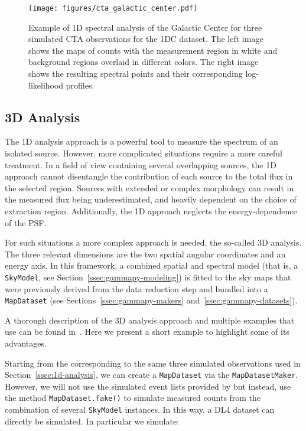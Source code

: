 \documentclass[traditabstract, longauth]{aa}
\newcommand{\code}[1]{\texttt{#1}}
\begin{document}
\begin{figure*}[t]
	\centering
	\texttt{[image: figures/cta\_galactic\_center.pdf]}
	\caption{
		Example of 1D spectral analysis of the Galactic Center for three simulated CTA
		observations for the 1DC dataset. The left image shows the maps of counts with the measurement
		region in white and background regions overlaid in different colors. The right image
		shows the resulting spectral points and their corresponding log-likelihood
		profiles.} \label{fig:cta_galactic_center} \end{figure*}


\subsection{3D Analysis}
\label{ssec:3d-analysis}
The 1D analysis approach is a powerful tool to measure the spectrum of an
isolated source. However, more complicated situations require a more careful
treatment. In a field of view containing several overlapping sources, the 1D
approach cannot disentangle the contribution of each source to the total flux in
the selected region. Sources with extended or complex morphology can result in
the measured flux being underestimated, and heavily dependent on the choice of
extraction region. Additionally, the 1D approach neglects the energy-dependence
of the PSF.

For such situations a more complex approach is needed, the so-called 3D
analysis. The three relevant dimensions are the two spatial angular coordinates
and an energy axis. In this framework, a combined spatial and spectral model
(that is, a \code{SkyModel}, see Section~\ref{ssec:gammapy-modeling}) is fitted to the
sky maps that were previously derived from the data reduction step and bundled into a
\code{MapDataset} (see Sections~\ref{ssec:gammapy-makers} and~\ref{ssec:gammapy-datasets}).

A thorough description of the 3D analysis approach and multiple examples that
use \gammapy can be found in~\cite{Mohrmann2019}. Here we present a short
example to highlight some of its advantages.

Starting from the \irfs corresponding to the same three simulated \cta
observations used in Section~\ref{ssec:1d-analysis}, we can create a \code{MapDataset}
via the \code{MapDatasetMaker}. However, we will not use the simulated event lists
provided by \cta but instead, use the method \code{MapDataset.fake()} to simulate
measured counts from the combination of several \code{SkyModel} instances. In this
way, a DL4 dataset can directly be simulated. In particular we simulate:
\end{document}
